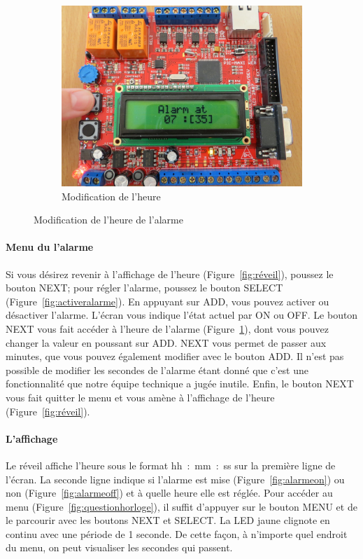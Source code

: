 \documentclass[12pt,a4paper]{article}
\begin{document}
\begin{figure}[!h]
\begin{subfigure}[b]{0.4\textwidth}
        \end{subfigure}
        \begin{subfigure}[b]{0.4\textwidth}
                \includegraphics[width=\textwidth]{photos/IMG_2157.JPG}
                \caption{Modification de l'heure}
                \label{fig:modificationalarme}
        \end{subfigure}
        \caption{Modification de l'heure de l'alarme}\label{fig:changeralarme}
\end{figure}

\paragraph{Menu du l'alarme} Si vous désirez revenir à l'affichage de l'heure (Figure~\ref{fig:réveil}), poussez le bouton NEXT; pour régler l'alarme, poussez le bouton SELECT (Figure~\ref{fig:activeralarme}). En appuyant sur ADD, vous pouvez activer ou désactiver l'alarme. L'écran vous indique l'état actuel par ON ou OFF. Le bouton NEXT vous fait accéder à l'heure de l'alarme (Figure~\ref{fig:modificationalarme}), dont vous pouvez changer la valeur en poussant sur ADD. NEXT vous permet de passer aux minutes, que vous pouvez également modifier avec le bouton ADD. Il n'est pas possible de modifier les secondes de l'alarme étant donné que c'est une fonctionnalité que notre équipe technique a jugée inutile. Enfin, le bouton NEXT vous fait quitter le menu et vous amène à l'affichage de l'heure (Figure~\ref{fig:réveil}).

\paragraph{L'affichage}
Le réveil affiche l'heure sous le format hh~:~mm~:~ss sur la première ligne de l'écran. La seconde ligne indique si l'alarme est mise (Figure~\ref{fig:alarmeon}) ou non (Figure~\ref{fig:alarmeoff}) et à quelle heure elle est réglée. Pour accéder au menu (Figure~\ref{fig:questionhorloge}), il suffit d'appuyer sur le bouton MENU et de le parcourir avec les boutons NEXT et SELECT. La LED jaune clignote en continu avec une période de 1 seconde. De cette façon, à n'importe quel endroit du menu, on peut visualiser les secondes qui passent.
\end{document}
